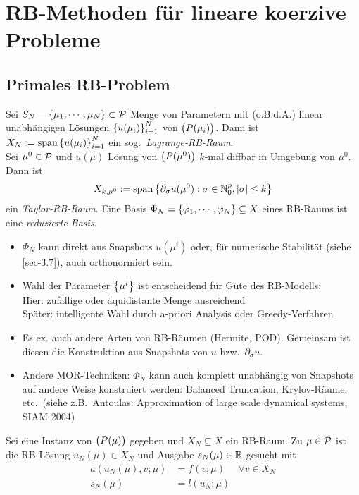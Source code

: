 \section{RB-Methoden für lineare koerzive Probleme}
\label{sec-3}

\subsection{Primales RB-Problem}

\begin{defn}
	Sei $S_N = \set{\mu_1,\cdots,\mu_N} \subset \p$ Menge von Parametern mit (o.B.d.A.) linear unabhängigen Lösungen $\set{u(\mu_i)}_{i=1}^N$ von $\prob[\mu_i]$.
	Dann ist $X_N := \spn{\set{u(\mu_i)}_{i=1}^N}$ ein sog.\ \emph{Lagrange-RB-Raum}.\\
	Sei $\mu^0 \in \p$ und $u(\mu)$ Lösung von $\prob[\mu^0]$ $k$-mal diffbar in Umgebung von $\mu^0$.
	Dann ist
	\[
		X_{k,\mu^0} := \spn{\set{\partial_\sigma u(\mu^0) : \sigma \in \N_0^p, |\sigma| \leq k}}
	\]
	ein \emph{Taylor-RB-Raum}.
	Eine Basis $\Phi_N = \set{\phi_1,\cdots,\phi_N} \subseteq X$ eines RB-Raums ist eine \emph{reduzierte Basis}.
\end{defn}

\begin{bem} \beginwithlistbem
	\begin{itemize}
		\item $\Phi_N$ kann direkt aus Snapshots $u(\mu^i)$ oder, für numerische Stabilität (siehe \ref{sec-3.7}), auch orthonormiert sein.
		\item Wahl der Parameter $\set{\mu^i}$ ist entscheidend für Güte des RB-Modells:\\
			Hier: zufällige oder äquidistante Menge ausreichend\\
			Später: intelligente Wahl durch a-priori Analysis oder Greedy-Verfahren
		\item Es ex. auch andere Arten von RB-Räumen (Hermite, POD).
			Gemeinsam ist diesen die Konstruktion aus Snapshots von $u$ bzw.\ $\partial_\sigma u$.
		\item Andere MOR-Techniken: $\Phi_N$ kann auch komplett unabhängig von Snapshots auf andere Weise konstruiert werden: Balanced Truncation, Krylov-Räume, etc.\ (siehe z.B.\ Antoulas: Approximation of large scale dynamical systems, SIAM 2004)
	\end{itemize}
\end{bem}

\begin{defn}
	Sei eine Instanz von $\prob$ gegeben und $X_N \subseteq X$ ein RB-Raum.
	Zu $\mu \in \p$ ist die RB-Lösung $u_N(\mu) \in X_N$ und Ausgabe $s_N(\mu) \in \R$ gesucht mit
	\begin{align*}
		a(u_N(\mu),v;\mu) &= f(v;\mu) &\forall v \in X_N\\
		s_N(\mu) &= l(u_N;\mu)
	\end{align*}
\end{defn}

